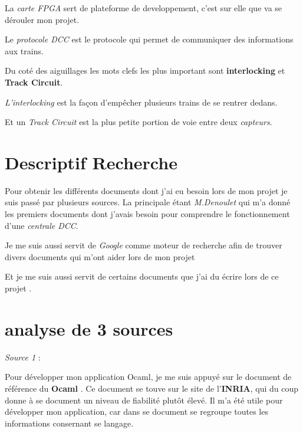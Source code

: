 \medskip

La \emph{carte FPGA} sert de plateforme de developpement, c'est sur elle que
va se dérouler mon projet.

Le \emph{protocole DCC} est le protocole qui permet de communiquer des
informations aux trains.

\bigskip

Du coté des aiguillages les mots clefs les plus important sont
\textbf{interlocking} et \textbf{Track Circuit}.

\medskip

\emph{L'interlocking} est la façon d'empêcher plusieurs trains de se rentrer
dedans.

Et un \emph{Track Circuit} est la plus petite portion de voie entre deux \emph{capteurs}.

\section{Descriptif Recherche}
\label{sec:descriptif}

Pour obtenir les différents documents dont j'ai eu besoin lors de mon
projet je suis passé par plusieurs sources. La principale étant
\emph{M.Denoulet} qui m'a donné les premiers documents \cite{FPGA1} \cite{DCC} \cite{Jouef}   dont j'avais besoin
pour comprendre le fonctionnement d'une \emph{centrale DCC}.

\smallskip

Je me suis aussi servit de \emph{Google} comme moteur de recherche afin de
trouver divers documents \cite{Xilink} \cite{IXL} \cite{OCAML}
\cite{VHDL} \cite{siteferro} qui m'ont aider lors de mon projet

\smallskip

Et je me suis aussi servit de certains documents que j'ai du écrire
lors de ce projet \cite{rapport}. 


\newpage

\section{analyse de 3 sources}
\label{sec:analyse}

\emph{Source 1} :

\smallskip

Pour développer mon application Ocaml, je me suis appuyé sur le
document de référence du \textbf{Ocaml} \cite{OCAML}. Ce document se touve sur
le site de l'\textbf{INRIA}, qui du coup donne à se document un niveau de
fiabilité plutôt élevé. Il m'a été utile pour développer mon
application, car dans se document se regroupe toutes les informations
consernant se langage.

